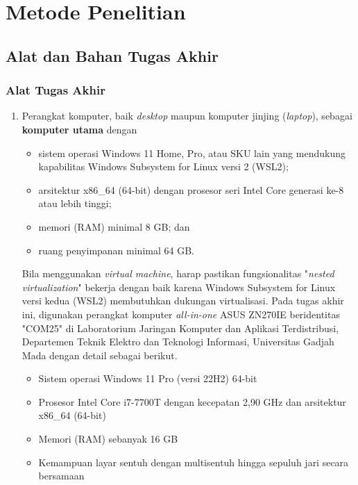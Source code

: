 \chapter{Metode Penelitian}

\section{Alat dan Bahan Tugas Akhir}

\subsection{Alat Tugas Akhir}

\begin{enumerate}
    \item Perangkat komputer, baik \textit{desktop} maupun komputer jinjing (\textit{laptop}), sebagai \textbf{komputer utama} dengan
    \begin{itemize}
        \item sistem operasi Windows 11 Home, Pro, atau SKU lain yang mendukung kapabilitas Windows Subsystem for Linux versi 2 (WSL2);
        \item arsitektur x86\_64 (64-bit) dengan prosesor seri Intel Core generasi ke-8 atau lebih tinggi;
        \item memori (RAM) minimal 8 GB; dan
        \item ruang penyimpanan minimal 64 GB.
    \end{itemize} Bila menggunakan \textit{virtual machine}, harap pastikan fungsionalitas "\textit{nested virtualization}" bekerja dengan baik karena Windows Subsystem for Linux versi kedua (WSL2) membutuhkan dukungan virtualisasi. Pada tugas akhir ini, digunakan perangkat komputer \textit{all-in-one} ASUS ZN270IE beridentitas "COM25" di Laboratorium Jaringan Komputer dan Aplikasi Terdistribusi, Departemen Teknik Elektro dan Teknologi Informasi, Universitas Gadjah Mada dengan detail sebagai berikut.
    \begin{itemize}
        \item Sistem operasi Windows 11 Pro (versi 22H2) 64-bit
        \item Prosesor Intel Core i7-7700T dengan kecepatan 2,90 GHz dan arsitektur x86\_64 (64-bit)
        \item Memori (RAM) sebanyak 16 GB
        \item Kemampuan layar sentuh dengan multisentuh hingga sepuluh jari secara bersamaan
    \end{itemize}


\end{enumerate}
